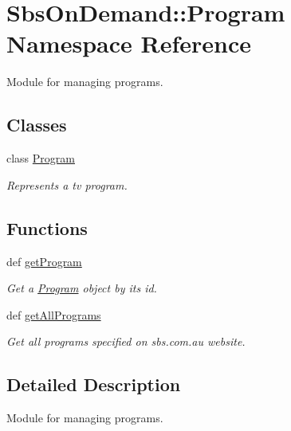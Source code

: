 \hypertarget{namespace_sbs_on_demand_1_1_program}{
\section{\-Sbs\-On\-Demand\-:\-:\-Program \-Namespace \-Reference}
\label{namespace_sbs_on_demand_1_1_program}
}


\-Module for managing programs.  


\subsection*{\-Classes}
\begin{DoxyCompactItemize}
\item 
class \hyperlink{class_sbs_on_demand_1_1_program_1_1_program}{\-Program}
\begin{DoxyCompactList}\small\item\em \-Represents a tv program. \end{DoxyCompactList}\end{DoxyCompactItemize}
\subsection*{\-Functions}
\begin{DoxyCompactItemize}
\item 
def \hyperlink{namespace_sbs_on_demand_1_1_program_af2d8bc3ca7c96855b257c97c2983b8bb}{get\-Program}
\begin{DoxyCompactList}\small\item\em \-Get a \hyperlink{class_sbs_on_demand_1_1_program_1_1_program}{\-Program} object by its id. \end{DoxyCompactList}\item 
def \hyperlink{namespace_sbs_on_demand_1_1_program_a8535cf09bb1f8ed248bc8afa078c9ae3}{get\-All\-Programs}
\begin{DoxyCompactList}\small\item\em \-Get all programs specified on sbs.\-com.\-au website. \end{DoxyCompactList}\end{DoxyCompactItemize}


\subsection{\-Detailed \-Description}
\-Module for managing programs. 

